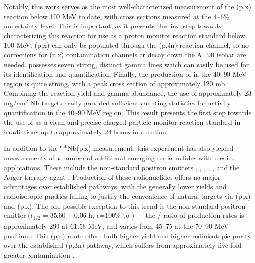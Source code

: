 \documentclass[3p]{elsarticle}
\begin{document}
Notably, this work serves as the most well-characterized measurement of the (p,x) reaction below 100 MeV to date, with cross sections measured  at the 4--6\% uncertainty level.
This is important, as it presents the first step towards characterizing this reaction for use as a proton monitor reaction standard below 100 MeV.
(p,x) can only be populated through the (p,4n) reaction channel, so no corrections for (n,x) contamination channels or decay down the A=90 isobar are needed.
  possesses seven strong, distinct gamma lines which can easily  be used for its identification and quantification.
Finally, the production of   in the 40--90 MeV region is quite strong, with a peak cross section of approximately 120 mb.
Combining the reaction yield and gamma abundance, the use of approximately 23 mg/cm$^2$ Nb targets easily provided sufficient counting statistics for activity quantification in the 40--90 MeV region.
This result presents the first step towards the use of  as a clean and precise   charged particle monitor reaction standard in irradiations up to approximately 24 hours in duration.





In addition to the $^\text{nat}$Nb(p,x) measurement, this experiment has also yielded measurements of  a number of additional  emerging radionuclides with medical applications.
These include the non-standard positron emitters 
 \cite{PMID:7632762,zweit1996medium,Graves2016,Rosch2014}, 
 \cite{Lewis2003,Bandari2014,mp500671j,Szelecsenyi1993,Aslam2009,Hilgers2003,Szelecsenyi2005,Voyles2017},   \cite{Valdovinos2017,Nickles2003,Qaim2008,QaimSyedM2011,Rosch1993,doi:10.1139/v67-193,levkovski1991cross,Johnson2015,Singh2013,Kiselev1974,Kandil2009}, 
  \cite{Verel2003,Dijkers2009,Dijkers2010,PhysRevC.38.1624,Omara2009},  
 \cite{Busse2002,Radchenko2012},  
and the Auger-therapy agent  \cite{Kovacs1991,Titarenko2011}. 
Production of these radionuclides offers no major advantages over established pathways, with the generally lower yields and radioisotopic purities failing to justify the convenience of natural targets  via   (p,x) and  (p,x). 
The one possible exception to this trend is the non-standard positron emitter  ($t_{1/2}=35.60\pm0.06$ h, $\epsilon$=100\% to  \cite{Bhat1998}) --- the / ratio of production rates is approximately 290 at 61.58 MeV, and varies from 45--75 at the 70--90 MeV positions.
This (p,x) route offers both higher yield and higher radioisotopic purity over the established  (p,3n) pathway, which suffers from approximately five-fold greater   contamination \cite{MICHEL1997153,Ditrói2013}.
\end{document}
